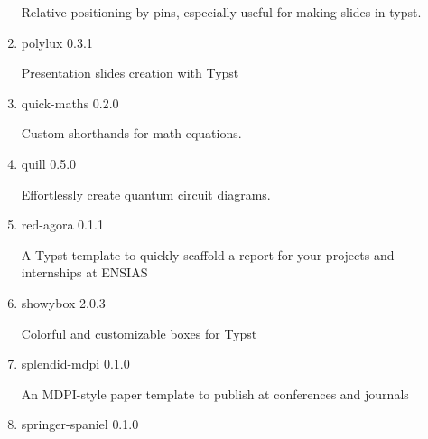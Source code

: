 \begin{enumerate}
  Relative positioning by pins, especially useful for making slides in
  typst.

  { }
\item
  \href{/universe/package/polylux/}{}

  { polylux } { 0.3.1 }

  Presentation slides creation with Typst

  { }
\item
  \href{/universe/package/quick-maths/}{}

  { quick-maths } { 0.2.0 }

  Custom shorthands for math equations.

  { }
\item
  \href{/universe/package/quill/}{}

  { quill } { 0.5.0 }

  Effortlessly create quantum circuit diagrams.

  { }
\item
  \href{/universe/package/red-agora/}{}


  { red-agora } { 0.1.1 }

  A Typst template to quickly scaffold a report for your projects and
  internships at ENSIAS

  { }
\item
  \href{/universe/package/showybox/}{}

  { showybox } { 2.0.3 }

  Colorful and customizable boxes for Typst

  { }
\item
  \href{/universe/package/splendid-mdpi/}{}


  { splendid-mdpi } { 0.1.0 }

  An MDPI-style paper template to publish at conferences and journals

  { }
\item
  \href{/universe/package/springer-spaniel/}{}


  { springer-spaniel } { 0.1.0 }


\end{enumerate}
